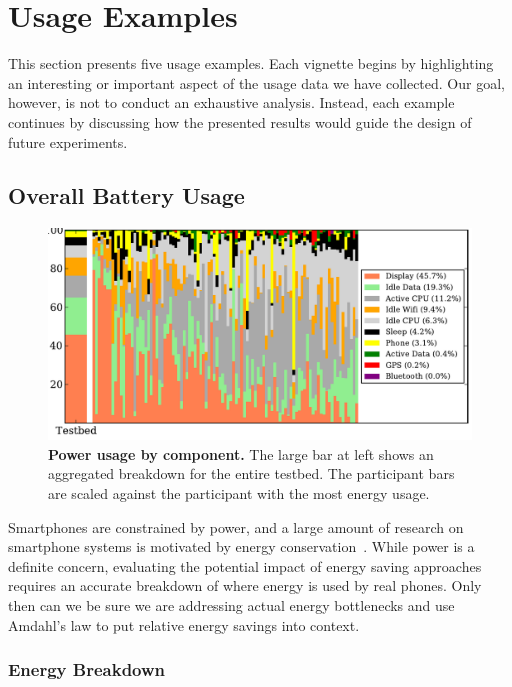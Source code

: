 \section{Usage Examples}
\label{sec-usage}

This section presents five \PhoneLab{} usage examples. Each vignette begins by
highlighting an interesting or important aspect of the usage data we have
collected. Our goal, however, is not to conduct an exhaustive analysis.
Instead, each example continues by discussing how the presented results would
guide the design of future \PhoneLab{} experiments.

\subsection{Overall Battery Usage}
\label{subsec-batteryoverview}

\begin{figure}[t]
\includegraphics[width=\textwidth]{./figures/power/breakdown/graph.pdf}
\caption{\textbf{Power usage by component.} The large bar at left shows an
aggregated breakdown for the entire testbed. The participant bars are scaled
against the participant with the most energy usage.}
\label{figure-batteryoverview}
\end{figure}

Smartphones are constrained by power, and a large amount of research on
smartphone systems is motivated by energy
conservation~\cite{shye:micro:2009,banerjee:ubicomp:2007,ace-mobisys12}. While
power is a definite concern, evaluating the potential impact of energy saving
approaches requires an accurate breakdown of where energy is used by real
phones. Only then can we be sure we are addressing actual energy bottlenecks and
use Amdahl's law to put relative energy savings into context.

\subsubsection{Energy Breakdown}

